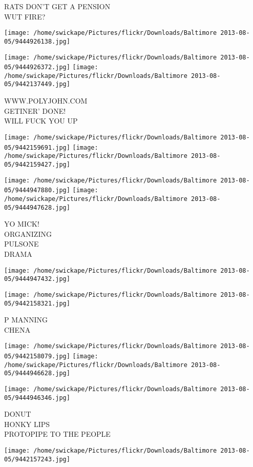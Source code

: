 \documentclass[10pt,letterpaper]{article}
\begin{document}
RATS DON'T GET A PENSION\\
WUT FIRE?
\pagebreak

\texttt{[image: /home/swickape/Pictures/flickr/Downloads/Baltimore 2013-08-05/9444926138.jpg]}

\vspace{0.25in}
\texttt{[image: /home/swickape/Pictures/flickr/Downloads/Baltimore 2013-08-05/9444926372.jpg]}
\texttt{[image: /home/swickape/Pictures/flickr/Downloads/Baltimore 2013-08-05/9442137449.jpg]}

WWW.POLYJOHN.COM\\
GETINER' DONE!\\
WILL FUCK YOU UP
\pagebreak

\texttt{[image: /home/swickape/Pictures/flickr/Downloads/Baltimore 2013-08-05/9442159691.jpg]}
\texttt{[image: /home/swickape/Pictures/flickr/Downloads/Baltimore 2013-08-05/9442159427.jpg]}

\texttt{[image: /home/swickape/Pictures/flickr/Downloads/Baltimore 2013-08-05/9444947880.jpg]}
\texttt{[image: /home/swickape/Pictures/flickr/Downloads/Baltimore 2013-08-05/9444947628.jpg]}

YO MICK!\\
ORGANIZING\\
PULSONE\\
DRAMA
\pagebreak

\texttt{[image: /home/swickape/Pictures/flickr/Downloads/Baltimore 2013-08-05/9444947432.jpg]}

\vspace{0.25in}
\texttt{[image: /home/swickape/Pictures/flickr/Downloads/Baltimore 2013-08-05/9442158321.jpg]}

P MANNING\\
CHENA
\pagebreak

\texttt{[image: /home/swickape/Pictures/flickr/Downloads/Baltimore 2013-08-05/9442158079.jpg]}
\texttt{[image: /home/swickape/Pictures/flickr/Downloads/Baltimore 2013-08-05/9444946628.jpg]}

\texttt{[image: /home/swickape/Pictures/flickr/Downloads/Baltimore 2013-08-05/9444946346.jpg]}

DONUT\\
HONKY LIPS\\
PROTOPIPE TO THE PEOPLE
\pagebreak

\texttt{[image: /home/swickape/Pictures/flickr/Downloads/Baltimore 2013-08-05/9442157243.jpg]}
\end{document}
